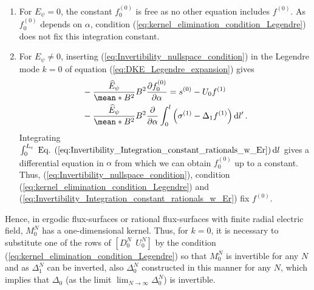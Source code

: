 \begin{enumerate}
	\item For $E_\psi =0$, the constant $f^{(0)}_0$ is free as no other equation includes $f^{(0)}$. As $f_0^{(0)}$ depends on $\alpha$, condition (\ref{eq:kernel_elimination_condition_Legendre}) does not fix this integration constant. %
%	
	\item For $E_\psi \ne 0$,	
	 inserting (\ref{eq:Invertibility_nullspace_condition}) in the Legendre mode $k=0$ of equation (\ref{eq:DKE_Legendre_expansion}) gives
	 \begin{align}  
	 	& -\frac{\widehat{E}_\psi}{\mean*{B^2}}
	 	B^2 \pdv{f_0^{(0)}}{\alpha} 
	 	=
	 	s^{(0)}
	 	- U_0 f^{(1)}
	 	\label{eq:Invertibility_Integration_constant_rationals_w_Er}
	 	\\
	 	& %
	 	-
	 	\frac{\widehat{E}_\psi}{\mean*{B^2}}
	 	B^2 \pdv{}{\alpha} 
	 	\int_{0}^{l}
	 	\left(
	 	\sigma^{(1)}
	 	- \Delta_1 f^{(1)} 
	 	\right)\dd{l'}.\nonumber
	 \end{align}
     Integrating $\int_{0}^{L_{\text{c}}} \text{ Eq. (\ref{eq:Invertibility_Integration_constant_rationals_w_Er})}\dd{l}$ gives a differential equation in $\alpha$ from which we can obtain $f_0^{(0)}$ up to a constant. Thus, (\ref{eq:Invertibility_nullspace_condition}), condition (\ref{eq:kernel_elimination_condition_Legendre}) and (\ref{eq:Invertibility_Integration_constant_rationals_w_Er}) fix $f^{(0)}$. 
\end{enumerate} 

Hence, in ergodic flux-surfaces or rational flux-surfaces with finite radial electric field, $M_0^N$ has a one-dimensional kernel. Thus, for $k=0$, it is necessary to substitute one of the rows of $[D_0^N \ \ U_0^N]$ by the condition (\ref{eq:kernel_elimination_condition_Legendre}) so that $M_0^N$ is invertible for any $N$ and as $\Delta_1^N$ can be inverted, also $\Delta_0^N$ constructed in this manner for any $N$, which implies that $\Delta_0$ (as the limit $\lim_{N\rightarrow\infty} \Delta_0^N$) is invertible.
